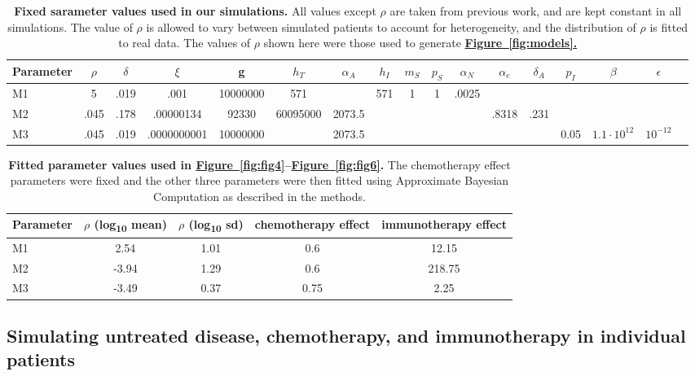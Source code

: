 \documentclass[a4paper,10pt]{article}
\newcommand{\myref}[2]{\hyperref[#1]{\bfseries Figure~\ref*{#1}#2}}
\begin{document}
\begin{table}
\small \centering
\addtolength{\tabcolsep}{-3pt}
\begin{tabular}{l|cccccccccccccccc}
Parameter & $\rho$ & $\delta$ & $\xi$ & g & $h_T$ & $\alpha_A$ & $h_I$ & $m_S$ & $p_S$ & $\alpha_N$ &  $\alpha_e$ & $\delta_A$ & $p_I$ & $\beta$ & $\epsilon$ & \\\hline
M1 & 5\phantom{.000} & .019 &   .001\phantom{0000000} & 10000000 & \phantom{00000}571 & & 571 & 1 & 1 & .0025\\
M2 & \phantom{0}.045 & .178 & .00000134\phantom{00} & \phantom{000}92330 & 60095000 & 2073.5 & & & & & .8318 & .231 \\
M3  & \phantom{0}.045 & .019 &   .0000000001 & 10000000 & &  2073.5 & & & & & & & 0.05 & $1.1\cdot10^{12}$ & $10^{-12}$ \\
\end{tabular}
\caption{{\bfseries Fixed sarameter values used in our simulations.} All values except $\rho$ are taken from previous work, and are kept
constant in all simulations. The value of $\rho$ is allowed to vary between simulated patients to account for heterogeneity, and the
distribution of $\rho$ is fitted to real data. The values of $\rho$ shown here were those used to generate \myref{fig:models}.}
\label{tab:parvals}
\end{table}


\begin{table}
\small
\begin{tabular}{l|cccc}
Parameter & $\rho$ (log\textsubscript{10} mean) & $\rho$ (log\textsubscript{10} sd) & chemotherapy effect & immunotherapy effect \\\hline
M1	  & 2.54 &  1.01 & 0.6 & 12.15 \\ 
M2        & -3.94 & 1.29 & 0.6 & 218.75 \\
M3 	  & -3.49 & 0.37 & 0.75 & 2.25 \\
\end{tabular}
\caption{{\bfseries Fitted parameter values used in \myref{fig:fig4}{}--\myref{fig:fig6}{}.} The chemotherapy effect parameters were fixed and the other three parameters were then fitted using Approximate Bayesian Computation as described in the methods.}
\label{tab:parfits}
\end{table}

\subsection*{Simulating untreated disease, chemotherapy, and immunotherapy in individual patients}
\end{document}
